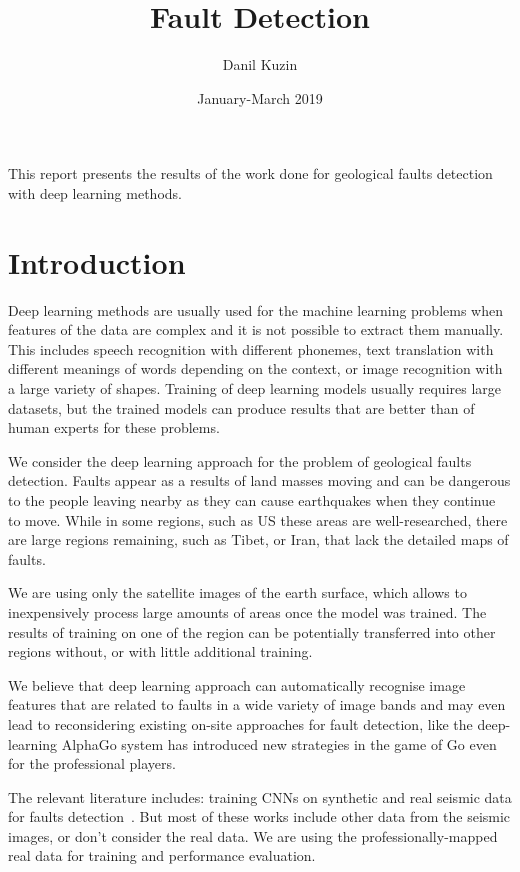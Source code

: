 \documentclass[11pt,a4paper]{article}
\begin{document}
\title{Fault Detection}
\author{Danil Kuzin}
\date{January-March 2019}
\maketitle

\abstract
This report presents the results of the work done for geological faults detection with deep learning methods.



\section{Introduction}
Deep learning methods are usually used for the machine learning problems when features of the data are complex and it
is not possible to extract them manually. This includes speech recognition with different phonemes, text translation
with different meanings of words depending on the context, or image recognition with a large variety of shapes. Training
of deep learning models usually requires large datasets, but the trained models can produce results that are better than
of human experts for these problems.

We consider the deep learning approach for the problem of geological faults detection. Faults appear as a results of
land masses moving and can be dangerous to the people leaving nearby as they can cause earthquakes when they continue to
move. While in some regions, such as US these areas are well-researched, there are large regions remaining, such as Tibet,
or Iran, that lack the detailed maps of faults.

We are using only the satellite images of the earth surface, which allows to inexpensively process large amounts of areas
once the model was trained. The results of training on one of the region can be potentially transferred into other regions
without, or with little additional training.

We believe that deep learning approach can automatically recognise image features that are related to faults in a wide
variety of image bands and may even lead to reconsidering existing on-site approaches for fault detection, like the
deep-learning AlphaGo system has introduced new strategies in the game of Go even for the professional players.

The relevant literature includes: training CNNs on synthetic and real seismic data for faults
detection~\cite{pochet2018seismic, araya2017automated, xiong2018seismic, chehrazi2013seismic, lu2018using, hale2014}.
But most of these works include other data from the seismic images, or don't consider the real data. We are using the
professionally-mapped real data for training and performance evaluation.
\end{document}
